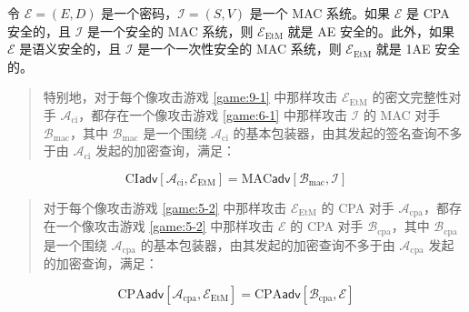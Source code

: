 \begin{theorem}\label{theo:9-2}
令 $\mathcal{E}=(E,D)$ 是一个密码，$\mathcal{I}=(S,V)$ 是一个 MAC 系统。如果 $\mathcal{E}$ 是 CPA 安全的，且 $\mathcal{I}$ 是一个安全的 MAC 系统，则 $\mathcal{E}_\mathrm{EtM}$ 就是 AE 安全的。此外，如果 $\mathcal{E}$ 是语义安全的，且 $\mathcal{I}$ 是一个一次性安全的 MAC 系统，则 $\mathcal{E}_\mathrm{EtM}$ 就是 1AE 安全的。
\begin{quote}
特别地，对于每个像攻击游戏 \ref{game:9-1} 中那样攻击 $\mathcal{E}_\mathrm{EtM}$ 的密文完整性对手 $\mathcal{A}_\mathrm{ci}$，都存在一个像攻击游戏 \ref{game:6-1} 中那样攻击 $\mathcal{I}$ 的 MAC 对手 $\mathcal{B}_\mathrm{mac}$，其中 $\mathcal{B}_\mathrm{mac}$ 是一个围绕 $\mathcal{A}_\mathrm{ci}$ 的基本包装器，由其发起的签名查询不多于由 $\mathcal{A}_\mathrm{ci}$ 发起的加密查询，满足：
\end{quote}
\[
\mathrm{CI}\mathsf{adv}[\mathcal{A}_\mathrm{ci},\mathcal{E}_\mathrm{EtM}]
=
\mathrm{MAC}\mathsf{adv}[\mathcal{B}_\mathrm{mac},\mathcal{I}]
\]
\begin{quote}
对于每个像攻击游戏 \ref{game:5-2} 中那样攻击 $\mathcal{E}_\mathrm{EtM}$ 的 CPA 对手 $\mathcal{A}_\mathrm{cpa}$，都存在一个像攻击游戏 \ref{game:5-2} 中那样攻击 $\mathcal{E}$ 的 CPA 对手 $\mathcal{B}_\mathrm{cpa}$，其中 $\mathcal{B}_\mathrm{cpa}$ 是一个围绕 $\mathcal{A}_\mathrm{cpa}$ 的基本包装器，由其发起的加密查询不多于由 $\mathcal{A}_\mathrm{cpa}$ 发起的加密查询，满足：
\end{quote}
\[
\mathrm{CPA}\mathsf{adv}[\mathcal{A}_\mathrm{cpa},\mathcal{E}_\mathrm{EtM}]
=
\mathrm{CPA}\mathsf{adv}[\mathcal{B}_\mathrm{cpa},\mathcal{E}]
\]
\end{theorem}

